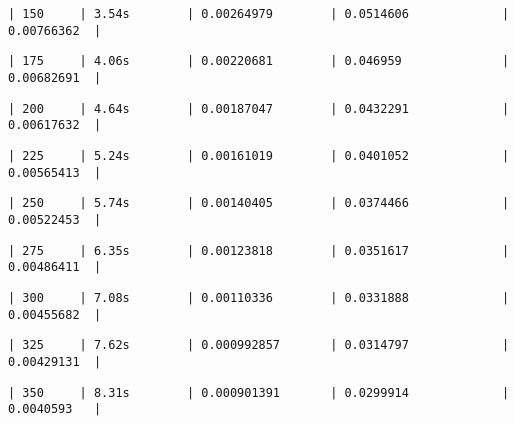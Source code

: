 \documentclass[11pt]{article}
\begin{document}
    
    
    \begin{verbatim}
| 150     | 3.54s        | 0.00264979        | 0.0514606             | 0.00766362  |
    \end{verbatim}

    
    
    \begin{verbatim}
| 175     | 4.06s        | 0.00220681        | 0.046959              | 0.00682691  |
    \end{verbatim}

    
    
    \begin{verbatim}
| 200     | 4.64s        | 0.00187047        | 0.0432291             | 0.00617632  |
    \end{verbatim}

    
    
    \begin{verbatim}
| 225     | 5.24s        | 0.00161019        | 0.0401052             | 0.00565413  |
    \end{verbatim}

    
    
    \begin{verbatim}
| 250     | 5.74s        | 0.00140405        | 0.0374466             | 0.00522453  |
    \end{verbatim}

    
    
    \begin{verbatim}
| 275     | 6.35s        | 0.00123818        | 0.0351617             | 0.00486411  |
    \end{verbatim}

    
    
    \begin{verbatim}
| 300     | 7.08s        | 0.00110336        | 0.0331888             | 0.00455682  |
    \end{verbatim}

    
    
    \begin{verbatim}
| 325     | 7.62s        | 0.000992857       | 0.0314797             | 0.00429131  |
    \end{verbatim}

    
    
    \begin{verbatim}
| 350     | 8.31s        | 0.000901391       | 0.0299914             | 0.0040593   |
    \end{verbatim}
\end{document}
